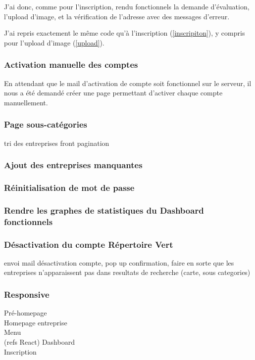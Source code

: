 J'ai donc, comme pour l'inscription, rendu fonctionnels la demande d'évaluation, l'upload d'image, et la vérification de l'adresse avec des messages d'erreur.

J'ai repris exactement le même code qu'à l'inscription (\ref{inscripiton}), y compris pour l'upload d'image (\ref{upload}). 

\subsubsection{Activation manuelle des comptes}


En attendant que le mail d'activation de compte soit fonctionnel sur le serveur, il nous a été demandé créer une page permettant d'activer chaque compte manuellement.


\subsubsection{Page sous-catégories}
tri des entreprises
front
pagination

\subsubsection{Ajout des entreprises manquantes}

\subsubsection{Réinitialisation de mot de passe}

\subsubsection{Rendre les graphes de statistiques du Dashboard fonctionnels}

\subsubsection{Désactivation du compte Répertoire Vert}
envoi mail désactivation compte, pop up confirmation, faire en sorte que les entreprises n'apparaissent pas dans resultats de recherche (carte, sous categories)

\subsubsection{Responsive}
Pré-homepage\\
Homepage entreprise\\
Menu\\ (refs React)
Dashboard\\
Inscription

